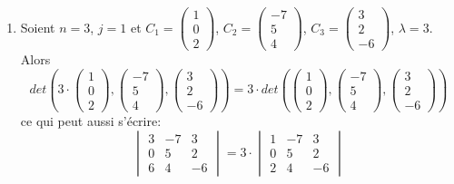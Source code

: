 \begin{enumerate}
  \item Soient $n = 3$, $j = 1$ et $C_1 = \begin{pmatrix} 1 \\ 0 \\ 2 \end{pmatrix}$, $C_2 = \begin{pmatrix} -7 \\ 5 \\ 4 \end{pmatrix}$, $C_3 = \begin{pmatrix} 3 \\ 2 \\ -6 \end{pmatrix}$, $\lambda = 3$. Alors
    $$det\left( 
        3 \cdot \begin{pmatrix} 1 \\ 0 \\ 2 \end{pmatrix}, 
        \begin{pmatrix} -7 \\ 5 \\ 4 \end{pmatrix}, 
        \begin{pmatrix} 3 \\ 2 \\ -6 \end{pmatrix}
      \right)= 3 \cdot det\left(
        \begin{pmatrix} 1 \\ 0 \\ 2 \end{pmatrix}, 
        \begin{pmatrix} -7 \\ 5 \\ 4 \end{pmatrix}, 
        \begin{pmatrix} 3 \\ 2 \\ -6 \end{pmatrix} 
      \right)$$
    ce qui peut aussi s'écrire:
    $$\begin{vmatrix}
        3 & -7 & 3 \\
        0 & 5 & 2 \\ 
        6 & 4 & -6
      \end{vmatrix} 
      = 3 \cdot \begin{vmatrix}
        1 & -7 & 3 \\
        0 & 5 & 2 \\ 
        2 & 4 & -6
      \end{vmatrix}$$
    

\end{enumerate}
